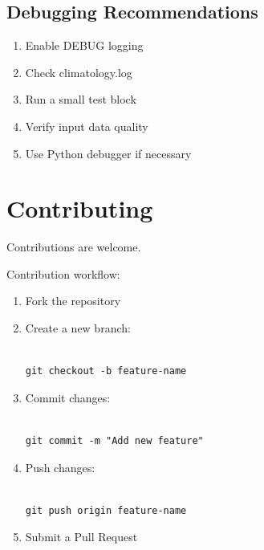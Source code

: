 \documentclass[11pt,a4paper]{article}
\begin{document}
\subsection{Debugging Recommendations}



\begin{enumerate}

\item Enable DEBUG logging

\item Check climatology.log

\item Run a small test block

\item Verify input data quality

\item Use Python debugger if necessary

\end{enumerate}





\section{Contributing}



Contributions are welcome.



Contribution workflow:



\begin{enumerate}


\item Fork the repository


\item Create a new branch:


\begin{verbatim}

git checkout -b feature-name

\end{verbatim}



\item Commit changes:


\begin{verbatim}

git commit -m "Add new feature"

\end{verbatim}



\item Push changes:


\begin{verbatim}

git push origin feature-name

\end{verbatim}



\item Submit a Pull Request


\end{enumerate}
\end{document}

